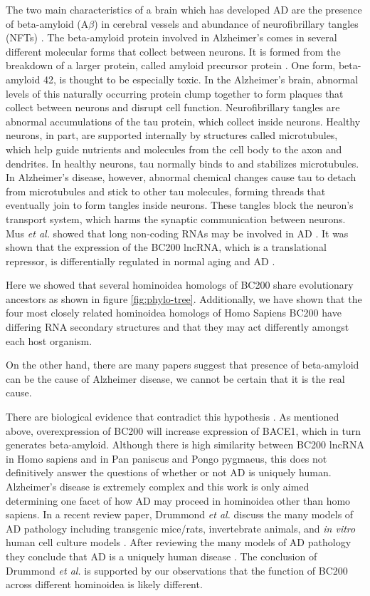 \documentclass[conference, 11pt]{IEEEtran}
\begin{document}
The two main characteristics of a brain which has developed AD are the presence of beta-amyloid (A$\beta$) in cerebral vessels and abundance of neurofibrillary tangles (NFTs) \cite{deture2019neuropathological}. 
The beta-amyloid protein involved in Alzheimer’s comes in several different molecular forms that collect between neurons. 
It is formed from the breakdown of a larger protein, called amyloid precursor protein \cite{zhang2021role}. 
One form, beta-amyloid 42, is thought to be especially toxic. 
In the Alzheimer’s brain, abnormal levels of this naturally occurring protein clump together to form plaques that collect between neurons and disrupt cell function. 
Neurofibrillary tangles are abnormal accumulations of the tau protein, which collect inside neurons. 
Healthy neurons, in part, are supported internally by structures called microtubules, which help guide nutrients and molecules from the cell body to the axon and dendrites. 
In healthy neurons, tau normally binds to and stabilizes microtubules. 
In Alzheimer’s disease, however, abnormal chemical changes cause tau to detach from microtubules and stick to other tau molecules, forming threads that eventually join to form tangles inside neurons. 
These tangles block the neuron’s transport system, which harms the synaptic communication between neurons\cite{swerdlow2011brain}. 
Mus \emph{et al.} showed that long non-coding RNAs may be involved in AD \cite{mus2007dendritic}. 
It was shown that the expression of the BC200 lncRNA, which is a translational repressor, is differentially regulated in normal aging and AD \cite{mus2007dendritic}. 

Here we showed that several hominoidea homologs of BC200 share evolutionary ancestors as shown in figure \ref{fig:phylo-tree}. 
Additionally, we have shown that the four most closely related hominoidea homologs of Homo Sapiens BC200 have differing RNA secondary structures and that they may act differently amongst each host organism. 

On the other hand, there are many papers suggest that presence of beta-amyloid can be the cause of Alzheimer disease, we cannot be certain that it is the real cause. 

There are biological evidence that contradict this hypothesis \cite{selkoe2016amyloid}. 
As mentioned above, overexpression of BC200 will increase expression of BACE1, which in turn generates beta-amyloid. 
Although there is high similarity between BC200 lncRNA in Homo sapiens and in Pan paniscus and Pongo pygmaeus, this does not definitively answer the questions of whether or not AD is uniquely human. 
Alzheimer’s disease is extremely complex and this work is only aimed determining one facet of how AD may proceed in hominoidea other than homo sapiens. 
In a recent review paper, Drummond \emph{et al.} discuss the many models of AD pathology including transgenic mice/rats, invertebrate animals, and \emph{in vitro} human cell culture models \cite{drummond2017alzheimer}. 
After reviewing the many models of AD pathology they conclude that AD is a uniquely human disease \cite{drummond2017alzheimer}. 
The conclusion of Drummond \emph{et al.} is supported by our observations that the function of BC200 across different hominoidea is likely different.
\end{document}
